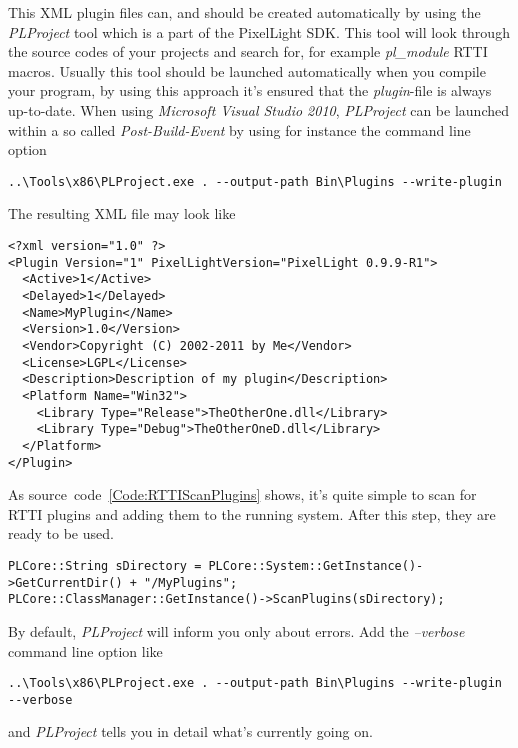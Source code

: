 This \ac{XML} plugin files can, and should be created automatically by using the \emph{PLProject} tool which is a part of the PixelLight \ac{SDK}. This tool will look through the source codes of your projects and search for, for example \emph{pl\_module} \ac{RTTI} macros. Usually this tool should be launched automatically when you compile your program, by using this approach it's ensured that the \emph{plugin}-file is always up-to-date. When using \emph{Microsoft Visual Studio 2010}, \emph{PLProject} can be launched within a so called \emph{Post-Build-Event} by using for instance the command line option
\begin{verbatim}
..\Tools\x86\PLProject.exe . --output-path Bin\Plugins --write-plugin
\end{verbatim}
The resulting \ac{XML} file may look like
\begin{verbatim}
<?xml version="1.0" ?>
<Plugin Version="1" PixelLightVersion="PixelLight 0.9.9-R1">
  <Active>1</Active>
  <Delayed>1</Delayed>
  <Name>MyPlugin</Name>
  <Version>1.0</Version>
  <Vendor>Copyright (C) 2002-2011 by Me</Vendor>
  <License>LGPL</License>
  <Description>Description of my plugin</Description>
  <Platform Name="Win32">
    <Library Type="Release">TheOtherOne.dll</Library>
    <Library Type="Debug">TheOtherOneD.dll</Library>
  </Platform>
</Plugin>
\end{verbatim}

As source~code~\ref{Code:RTTIScanPlugins} shows, it's quite simple to scan for \ac{RTTI} plugins and adding them to the running system. After this step, they are ready to be used.
\begin{lstlisting}[float=htb,label=Code:RTTIScanPlugins,caption={Scanning for \ac{RTTI} plugins to add}]
PLCore::String sDirectory = PLCore::System::GetInstance()->GetCurrentDir() + "/MyPlugins";
PLCore::ClassManager::GetInstance()->ScanPlugins(sDirectory);
\end{lstlisting}

By default, \emph{PLProject} will inform you only about errors. Add the \emph{--verbose} command line option like
\begin{verbatim}
..\Tools\x86\PLProject.exe . --output-path Bin\Plugins --write-plugin --verbose
\end{verbatim}
and \emph{PLProject} tells you in detail what's currently going on.


